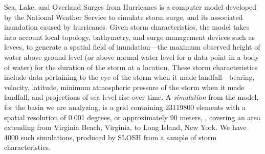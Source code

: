 Sea, Lake, and Overland Surges from Hurricanes \citep{jelesnianski1992} is a 
    computer model developed by the National Weather Service to simulate storm 
    surge, and its associated inundation caused by hurricanes.   Given storm 
    characteristics, the model takes into account local topology, bathymetry, 
    and surge management devices such as levees, to generate a spatial field of 
    inundation---the maximum observed height of water above ground level 
    (or above normal water level for a data point in a body of water) for the 
    duration of the storm at a location.   These storm characteristics include 
    data pertaining to the eye of the storm when it made landfall---bearing, 
    velocity, latitude, minimum atmospheric pressure of the storm when it 
    made landfall, and projections of sea level rise over time.  A 
    \emph{simulation} from the model, for the basin we are analyzing, is a grid 
    containing \num{23119800} elements with a spatial resolution of 
    \num{0.001} degrees, or approximately 90 meters, , 
    covering an area extending from Virginia Beach, Virginia, to Long Island, 
    New York.  We have \num{4000} such simulations, produced by SLOSH from a 
    sample of storm characteristics.

